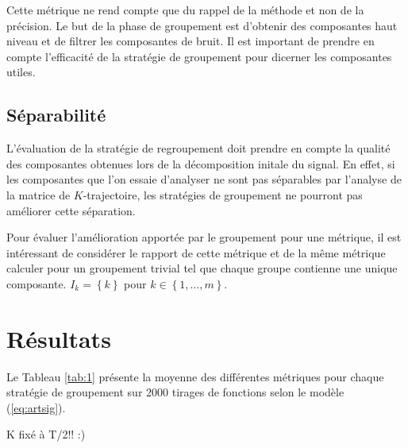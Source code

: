 \documentclass{gretsi}
\newcommand{\set}[1]{\left \{ 1, \dots, #1 \right \}}
\begin{document}
    Cette métrique ne rend compte que du rappel de la méthode et non de la précision. Le but de la phase de groupement est d'obtenir des composantes haut niveau et de filtrer les composantes de bruit. Il est important de prendre en compte l'efficacité de la stratégie de groupement pour dicerner les composantes utiles.


\subsection{Séparabilité}
\label{sub:sep}
    L'évaluation de la stratégie de regroupement doit prendre en compte la qualité des composantes obtenues lors de la décomposition initale du signal. En effet, si les composantes que l'on essaie d'analyser ne sont pas séparables par l'analyse de la matrice de $K$-trajectoire, les stratégies de groupement ne pourront pas améliorer cette séparation.
    
       
   Pour évaluer l'amélioration apportée par le groupement pour une métrique, il est intéressant de considérer le rapport de cette métrique et de la même métrique calculer pour un groupement trivial tel que chaque groupe contienne une unique composante. $I_k = \left \{ k \right \}$ pour $k \in \set{m}$.

\section{Résultats}
\label{sec:res}
Le Tableau \ref{tab:1} présente la moyenne des différentes métriques pour chaque stratégie de groupement sur 2000 tirages de fonctions selon le modèle (\ref{eq:artsig}).

K fixé à T/2!! :)

 
{}
\end{document}
